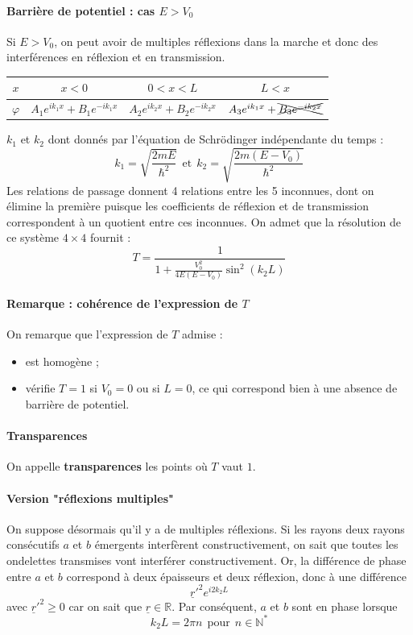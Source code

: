 \documentclass[french]{book}
\theoremstyle{plain}
\theoremstyle{definition}
\theoremstyle{remark}
\newcommand{\N}{\mathbb{N}}
\newcommand{\R}{\mathbb{R}}
\newcommand{\st}{^*}
\begin{document}
\paragraph{Barrière de potentiel : cas $E>V_0$} Si $E>V_0$, on peut avoir de multiples réflexions dans la marche et donc des interférences en réflexion et en transmission.
\begin{center}
	\begin{tabular}{|c|c|c|c|}
		\hline 
		$x$&$x<0$&$0<x<L$&$L<x$ \\
		\hline
		$\varphi$&$A_1e^{ik_1x}+B_1e^{-ik_1x}$&$A_2e^{ik_2x}+B_2e^{-ik_2x}$&$A_3e^{ik_1x}+\xcancel{B_3e^{-ik_2x}}$\\
		\hline
	\end{tabular}
\end{center}
$k_1$ et $k_2$ dont donnés par l'équation de Schrödinger indépendante du temps : $$k_1=\sqrt{\frac{2mE}{\hbar^2}} \ \ \text{et} \ \ k_2=\sqrt{\frac{2m(E-V_0)}{\hbar^2}}$$
Les relations de passage donnent 4 relations entre les 5 inconnues, dont on élimine la première puisque les coefficients de réflexion et de transmission correspondent à un quotient entre ces inconnues. On admet que la résolution de ce système $4\times 4$ fournit : $$T=\frac{1}{1+\displaystyle\frac{V_0^2}{4E(E-V_0)}\sin^2(k_2L)}$$
\paragraph{Remarque : cohérence de l'expression de $T$} On remarque que l'expression de $T$ admise :
\begin{itemize}
	\item est homogène ;
	\item vérifie $T=1$ si $V_0=0$ ou si $L=0$, ce qui correspond bien à une absence de barrière de potentiel.
\end{itemize}
\paragraph{Transparences} On appelle \textbf{transparences} les points où $T$ vaut $1$. 
\paragraph{Version "réflexions multiples"} On suppose désormais qu'il y a de multiples réflexions. Si les rayons deux rayons consécutifs $a$ et $b$ émergents interfèrent constructivement, on sait que toutes les ondelettes transmises vont interférer constructivement. Or, la différence de phase entre $a$ et $b$ correspond à deux épaisseurs et deux réflexion, donc à une différence $$\underline{r}'^2e^{i2k_2L}$$ avec $\underline{r}'^2\geqslant 0$ car on sait que $\underline{r}\in\R$. Par conséquent, $a$ et $b$ sont en phase lorsque $$k_2L=2\pi n\ \ \text{pour} \ \ n\in\N\st$$
\end{document}
